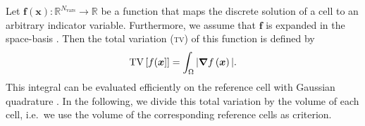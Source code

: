 Let $\bm{f}(\bm{x}): \mathbb{R}^{N_\text{vars}} \to \mathbb{R}$ be a function that maps the discrete solution of a cell to an arbitrary indicator variable.
Furthermore, we assume that $\bm{f}$ is expanded in the space-basis .
Then the total variation (\textsc{tv}) of this function is defined by
\newcommand{\tv}{\operatorname{TV}}
\begin{equation}
  \label{eq:tv}
  \tv \left[ f(\bm{x}] \right] =
\int_{\domain} \vert \gradient{f \left( \bm{x} \right)} \vert.
\end{equation}
This integral can be evaluated efficiently on the reference cell  with Gaussian quadrature .
In the following, we divide this total variation by the volume of each cell, i.e.\ we use the volume of the corresponding reference cells as criterion. 

